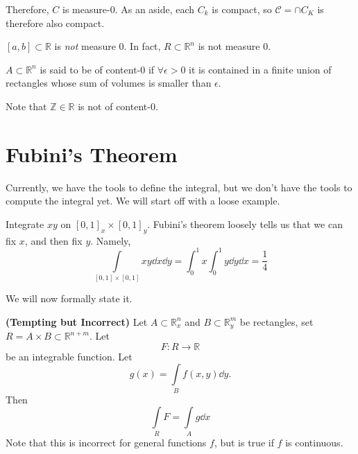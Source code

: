 \documentclass{article}
\numberwithin{equation}{section}
\begin{document}
Therefore, $C$ is measure-$0$. As an aside, each $C_k$ is compact, so $\mathcal{C} = \cap C_K$ is therefore also compact.
\begin{theorem}
    $[a,b] \subset \mathbb{R}$ is \textit{not} measure $0$. In fact, $R \subset \mathbb{R}^n$ is not measure $0$.
\end{theorem}
\begin{definition}
    $A\subset \mathbb{R}^n$ is said to be of content-$0$ if $\forall \epsilon > 0$ it is contained in a finite union of rectangles whose sum of volumes is smaller than $\epsilon$.
\end{definition}
Note that $\mathbb{Z} \in \mathbb{R}$ is not of content-$0$.
\section{Fubini's Theorem}
Currently, we have the tools to define the integral, but we don't have the tools to compute the integral yet. We will start off with a loose example.
\begin{example}
    Integrate $xy$ on $[0,1]_x \times [0,1]_y.$ Fubini's theorem loosely tells us that we can fix $x$, and then fix $y$. Namely,
    \begin{equation}
        \int\limits_{[0,1]\times [0,1]}xy \dd{x}\dd{y} = \int_0^1 x \int_0^1 y \dd{y}\dd{x} = \frac{1}{4}
    \end{equation}
\end{example}
We will now formally state it.
\begin{theorem}
    \textbf{(Tempting but Incorrect)} Let $A\subset \mathbb{R}_x^n$ and $B\subset \mathbb{R}_y^m$ be rectangles, set $R=A\times B \subset \mathbb{R}^{n+m}.$ Let
    \begin{equation}
        F:R \rightarrow \mathbb{R}
    \end{equation}
    be an integrable function. Let
    \begin{equation}
        g(x) = \int\limits_{B} f(x,y) \dd{y}.
    \end{equation}
    Then
    \begin{equation}
        \int\limits_R F =  \int\limits_A g \dd{x}
    \end{equation}
    Note that this is incorrect for general functions $f$, but is true if $f$ is continuous.
\end{theorem}
\end{document}
